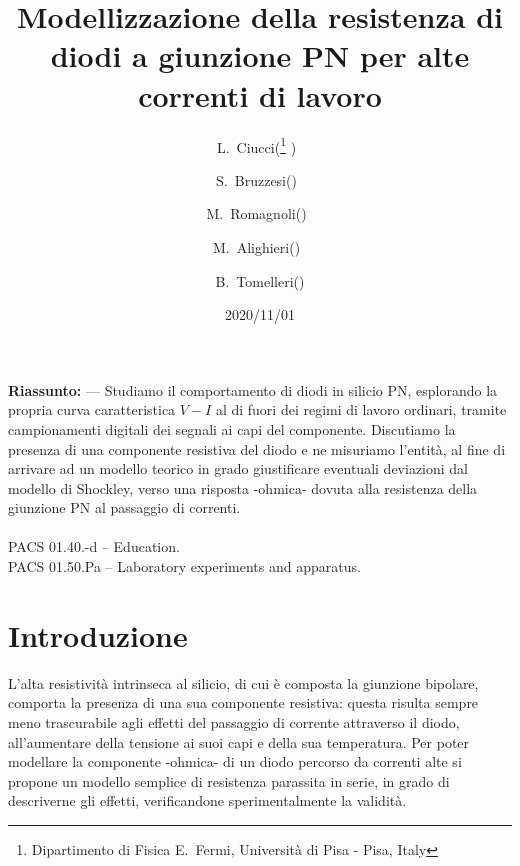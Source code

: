 \documentclass{article}[a4paper, oneside, 11pt]
\title{Modellizzazione della resistenza di diodi a giunzione PN per alte correnti di lavoro}
\author{L.~Ciucci(\thanks{Dipartimento di Fisica E.~Fermi, Universit\`a di Pisa - Pisa, Italy} )~\and S.~Bruzzesi(\protect\footnotemark[1] )~\and M.~Romagnoli(\protect\footnotemark[1] )~\and M.~Alighieri(\protect\footnotemark[1] )~\and B.~Tomelleri(\protect\footnotemark[1] )}
\date{2020/11/01}
\begin{document}
\maketitle

\begin{mdframed}
\textbf{Riassunto:} --- Studiamo il comportamento di diodi in silicio PN,
esplorando la propria curva caratteristica $V - I$ al di fuori dei regimi di
lavoro ordinari, tramite campionamenti digitali dei segnali ai capi del
componente. Discutiamo la presenza di una componente resistiva del diodo e ne
misuriamo l'entità, al fine di arrivare ad un modello teorico in grado
giustificare eventuali deviazioni dal modello di Shockley, verso una risposta
-ohmica- dovuta alla resistenza della giunzione PN al passaggio di correnti.\\\\
PACS 01.40.-d – Education.\\
PACS 01.50.Pa – Laboratory experiments and apparatus.
\end{mdframed}


\section{Introduzione}
L'alta resistività intrinseca al silicio, di cui è composta la giunzione
bipolare, comporta la presenza di una sua componente resistiva: questa 
risulta sempre meno trascurabile agli effetti del passaggio di corrente
attraverso il diodo, all'aumentare della tensione ai suoi capi e della sua 
temperatura. Per poter modellare la componente -ohmica- di un diodo
percorso da correnti alte si propone un modello semplice di resistenza
parassita in serie, in grado di descriverne gli effetti, verificandone 
sperimentalmente la validità.


\end{document}
